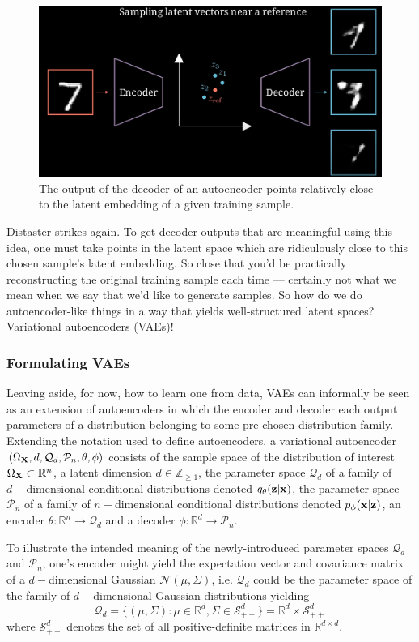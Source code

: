 \documentclass[11pt]{article}
\begin{document}
\begin{figure}[t]
    \centering
    \includegraphics[width=0.75\columnwidth]{./figures/generative_models/AE_gen_2.png}
    \caption{The output of the decoder of an autoencoder points relatively close to the latent embedding of a given training sample. }
    \label{fig:autoencoder_generation_2}
\end{figure}

\noindent Distaster strikes again. To get decoder outputs that are meaningful using this idea, one must take points in the latent space which are ridiculously close to this chosen sample's latent embedding. So close that you'd be practically reconstructing the original training sample each time — certainly not what we mean when we say that we'd like to generate samples. So how do we do autoencoder-like things in a way that yields well-structured latent spaces? Variational autoencoders (VAEs)!

\subsubsection{Formulating VAEs}
Leaving aside, for now, how to learn one from data, VAEs can informally be seen as an extension of autoencoders in which the encoder and decoder each output parameters of a distribution belonging to some pre-chosen distribution family. Extending the notation used to define autoencoders, a variational autoencoder $(\Omega_{\mathbf{X}},d,\mathcal{Q}_d,\mathcal{P}_n,\theta,\phi)$ consists of the sample space of the distribution of interest $\Omega_{\mathbf{X}}\subset\mathbb{R}^n$, a latent dimension $d\in\mathbb{Z}_{\geq1}$, the parameter space $\mathcal{Q}_d$ of a family of $d-$dimensional conditional distributions denoted $q_{\theta}(\mathbf{z}|\mathbf{x})$, the parameter space $\mathcal{P}_n$ of a family of $n-$dimensional conditional distributions denoted $p_{\phi}(\mathbf{x}|\mathbf{z})$, an encoder $\theta:\mathbb{R}^n\to\mathcal{Q}_d$ and a decoder $\phi:\mathbb{R}^d\to\mathcal{P}_n$.

To illustrate the intended meaning of the newly-introduced parameter spaces $\mathcal{Q}_d$ and $\mathcal{P}_n$, one's encoder might yield the expectation vector and covariance matrix of a $d-$dimensional Gaussian $\mathcal{N}(\mu,\Sigma)$, i.e. $\mathcal{Q}_d$ could be the parameter space of the family of $d-$dimensional Gaussian distributions yielding
$$
\mathcal{Q}_d
=
\{
(\mu,\Sigma):\mu\in\mathbb{R}^d, \Sigma\in\mathcal{S}_{++}^d
\}
=
\mathbb{R}^d\times\mathcal{S}_{++}^d
$$
where $\mathcal{S}_{++}^d$ denotes the set of all positive-definite matrices in $\mathbb{R}^{d\times d}$.
\end{document}
